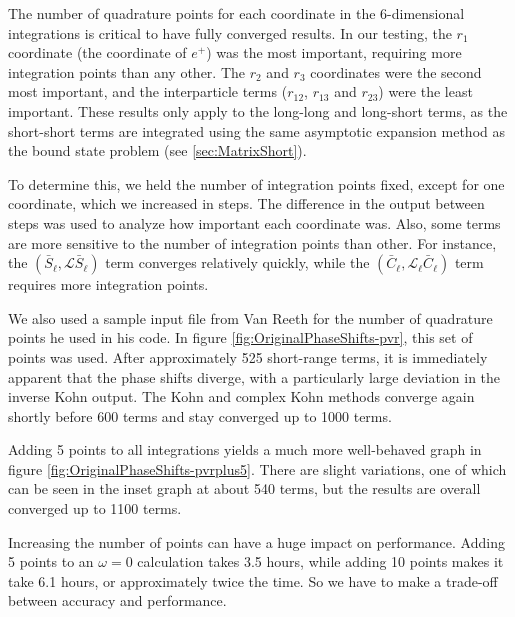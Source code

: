 \documentclass[Dissertation.tex]{subfiles}
\begin{document}

The number of quadrature points for each coordinate in the 6-dimensional 
integrations is critical to have fully converged results. In our testing, the 
$r_1$ coordinate (the coordinate of $e^+$) was the most important, requiring 
more integration points than any other. The $r_2$ and $r_3$ coordinates were 
the second most important, and the interparticle terms ($r_{12}$, $r_{13}$ 
and $r_{23}$) were the least important. These results only apply to the
long-long and long-short terms, as the short-short terms are integrated using 
the same asymptotic expansion method as the bound state problem
(see \cref{sec:MatrixShort}).

To determine this, we held the number of integration points fixed, except for 
one coordinate, which we increased in steps. The difference in the output 
between steps was used to analyze how important each coordinate was. Also, 
some terms are more sensitive to the number of integration points than other. 
For instance, the $(\bar{S}_\ell,\mathcal{L} \bar{S}_\ell)$ term converges 
relatively quickly, while the $(\bar{C}_\ell,\mathcal{L}_\ell \bar{C}_\ell)$ 
term requires more integration points.

We also used a sample input file from Van Reeth for the number of quadrature 
points he used in his code. In figure \ref{fig:OriginalPhaseShifts-pvr}, this 
set of points was used. After approximately 525 short-range terms, it is 
immediately apparent that the phase shifts diverge, with a particularly large 
deviation in the inverse Kohn output. The Kohn and complex Kohn methods 
converge again shortly before 600 terms and stay converged up to 1000 terms.

Adding 5 points to all integrations yields a much more well-behaved graph in 
figure \ref{fig:OriginalPhaseShifts-pvrplus5}. There are slight variations, 
one of which can be seen in the inset graph at about 540 terms, but the 
results are overall converged up to 1100 terms.

Increasing the number of points can have a huge impact on performance. Adding 
5 points to an $\omega = 0$ calculation takes 3.5 hours, while adding 10 
points makes it take 6.1 hours, or approximately twice the time. So we have 
to make a trade-off between accuracy and performance.
\end{document}
